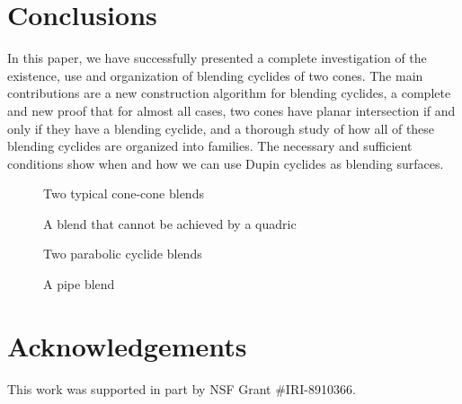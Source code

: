\section{Conclusions}
\label{section:cyc-concl}

In this paper, we have successfully presented a complete investigation
of the existence, use and organization of blending cyclides of two cones.  
The main contributions are a new 
construction algorithm for blending cyclides, a complete and new proof that 
for almost all cases, two cones have planar intersection 
if and only if they have a blending cyclide, and a thorough study of how all 
of these blending cyclides are organized into families.
The necessary and sufficient conditions show
when and how we can use Dupin cyclides as blending surfaces.

\begin{figure}
\vspace{3.5in}
\caption{Two typical cone-cone blends}
\label{fig:1}
\end{figure}

\begin{figure}
\vspace{3.5in}
\caption{A blend that cannot be achieved by a quadric}
\label{fig:2}
\end{figure}

\begin{figure}
\vspace{3.5in}
\caption{Two parabolic cyclide blends}
\label{fig:3}
\end{figure}

\begin{figure}
\vspace{3.5in}
\caption{A pipe blend}
\label{fig:4}
\end{figure}

\clearpage

\section{Acknowledgements}

This work was supported in part by NSF Grant \#IRI-8910366.

